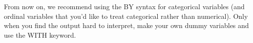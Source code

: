 \documentclass[]{book}\usepackage[]{graphicx}\usepackage[]{color}
\begin{document}
From now on, we recommend using the BY syntax for categorical variables (and ordinal variables that you'd like to treat categorical rather than numerical). Only when you find the output hard to interpret, make your own dummy variables and use the WITH keyword.





\end{document}
